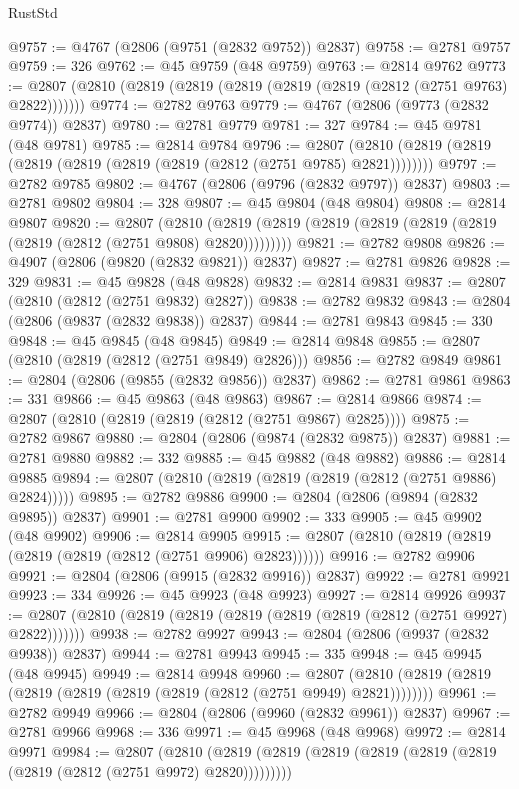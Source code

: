 \begin{lexlean}{RustStd}
\begin{coremodule}
@9757 := @4767 (@2806 (@9751 (@2832 @9752)) @2837)
@9758 := @2781 @9757
@9759 := 326
@9762 := @45 @9759 (@48 @9759)
@9763 := @2814 @9762
@9773 := @2807 (@2810 (@2819 (@2819 (@2819 (@2819 (@2819 (@2812 (@2751 @9763) @2822)))))))
@9774 := @2782 @9763
@9779 := @4767 (@2806 (@9773 (@2832 @9774)) @2837)
@9780 := @2781 @9779
@9781 := 327
@9784 := @45 @9781 (@48 @9781)
@9785 := @2814 @9784
@9796 := @2807 (@2810 (@2819 (@2819 (@2819 (@2819 (@2819 (@2819 (@2812 (@2751 @9785) @2821))))))))
@9797 := @2782 @9785
@9802 := @4767 (@2806 (@9796 (@2832 @9797)) @2837)
@9803 := @2781 @9802
@9804 := 328
@9807 := @45 @9804 (@48 @9804)
@9808 := @2814 @9807
@9820 := @2807
    (@2810 (@2819 (@2819 (@2819 (@2819 (@2819 (@2819 (@2819 (@2812 (@2751 @9808) @2820)))))))))
@9821 := @2782 @9808
@9826 := @4907 (@2806 (@9820 (@2832 @9821)) @2837)
@9827 := @2781 @9826
@9828 := 329
@9831 := @45 @9828 (@48 @9828)
@9832 := @2814 @9831
@9837 := @2807 (@2810 (@2812 (@2751 @9832) @2827))
@9838 := @2782 @9832
@9843 := @2804 (@2806 (@9837 (@2832 @9838)) @2837)
@9844 := @2781 @9843
@9845 := 330
@9848 := @45 @9845 (@48 @9845)
@9849 := @2814 @9848
@9855 := @2807 (@2810 (@2819 (@2812 (@2751 @9849) @2826)))
@9856 := @2782 @9849
@9861 := @2804 (@2806 (@9855 (@2832 @9856)) @2837)
@9862 := @2781 @9861
@9863 := 331
@9866 := @45 @9863 (@48 @9863)
@9867 := @2814 @9866
@9874 := @2807 (@2810 (@2819 (@2819 (@2812 (@2751 @9867) @2825))))
@9875 := @2782 @9867
@9880 := @2804 (@2806 (@9874 (@2832 @9875)) @2837)
@9881 := @2781 @9880
@9882 := 332
@9885 := @45 @9882 (@48 @9882)
@9886 := @2814 @9885
@9894 := @2807 (@2810 (@2819 (@2819 (@2819 (@2812 (@2751 @9886) @2824)))))
@9895 := @2782 @9886
@9900 := @2804 (@2806 (@9894 (@2832 @9895)) @2837)
@9901 := @2781 @9900
@9902 := 333
@9905 := @45 @9902 (@48 @9902)
@9906 := @2814 @9905
@9915 := @2807 (@2810 (@2819 (@2819 (@2819 (@2819 (@2812 (@2751 @9906) @2823))))))
@9916 := @2782 @9906
@9921 := @2804 (@2806 (@9915 (@2832 @9916)) @2837)
@9922 := @2781 @9921
@9923 := 334
@9926 := @45 @9923 (@48 @9923)
@9927 := @2814 @9926
@9937 := @2807 (@2810 (@2819 (@2819 (@2819 (@2819 (@2819 (@2812 (@2751 @9927) @2822)))))))
@9938 := @2782 @9927
@9943 := @2804 (@2806 (@9937 (@2832 @9938)) @2837)
@9944 := @2781 @9943
@9945 := 335
@9948 := @45 @9945 (@48 @9945)
@9949 := @2814 @9948
@9960 := @2807 (@2810 (@2819 (@2819 (@2819 (@2819 (@2819 (@2819 (@2812 (@2751 @9949) @2821))))))))
@9961 := @2782 @9949
@9966 := @2804 (@2806 (@9960 (@2832 @9961)) @2837)
@9967 := @2781 @9966
@9968 := 336
@9971 := @45 @9968 (@48 @9968)
@9972 := @2814 @9971
@9984 := @2807
    (@2810 (@2819 (@2819 (@2819 (@2819 (@2819 (@2819 (@2819 (@2812 (@2751 @9972) @2820)))))))))

\end{coremodule}
\end{lexlean}
